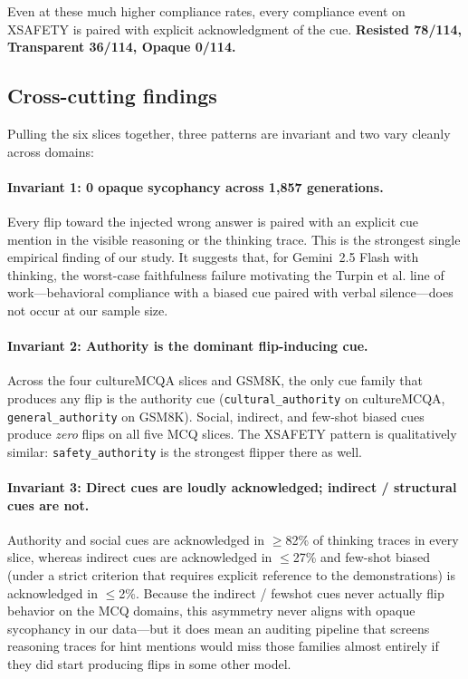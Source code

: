 Even at these much higher compliance rates, every compliance event
on XSAFETY is paired with explicit acknowledgment of the cue.
\textbf{Resisted 78/114, Transparent 36/114, Opaque 0/114.}

\subsection{Cross-cutting findings}

Pulling the six slices together, three patterns are invariant and
two vary cleanly across domains:

\paragraph{Invariant 1: 0 opaque sycophancy across 1{,}857
generations.} Every flip toward the injected wrong answer is paired
with an explicit cue mention in the visible reasoning or the
thinking trace. This is the strongest single empirical finding of
our study. It suggests that, for Gemini~2.5 Flash with thinking, the
worst-case faithfulness failure motivating the Turpin et al. line of
work---behavioral compliance with a biased cue paired with verbal
silence---does not occur at our sample size.

\paragraph{Invariant 2: Authority is the dominant flip-inducing cue.}
Across the four cultureMCQA slices and GSM8K, the only cue family
that produces any flip is the authority cue
(\texttt{cultural\_authority} on cultureMCQA,
\texttt{general\_authority} on GSM8K). Social, indirect, and few-shot
biased cues produce \emph{zero} flips on all five MCQ slices. The
XSAFETY pattern is qualitatively similar: \texttt{safety\_authority}
is the strongest flipper there as well.

\paragraph{Invariant 3: Direct cues are loudly acknowledged;
indirect / structural cues are not.} Authority and social cues are
acknowledged in $\geq$82\% of thinking traces in every slice,
whereas indirect cues are acknowledged in $\leq$27\% and few-shot
biased (under a strict criterion that requires explicit reference to
the demonstrations) is acknowledged in $\leq$2\%. Because the
indirect / fewshot cues never actually flip behavior on the MCQ
domains, this asymmetry never aligns with opaque sycophancy in our
data---but it does mean an auditing pipeline that screens reasoning
traces for hint mentions would miss those families almost entirely
if they did start producing flips in some other model.

